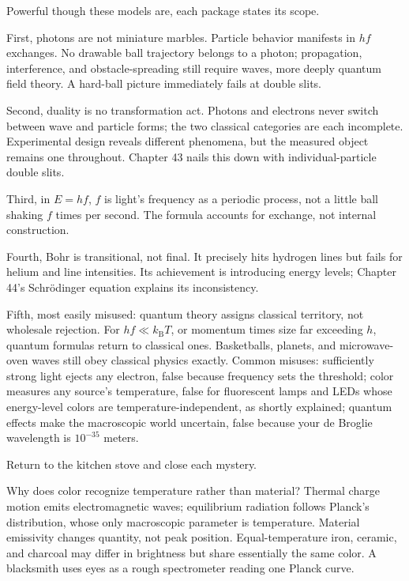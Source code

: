 
Powerful though these models are, each package states its scope.

First, photons are not miniature marbles. Particle behavior manifests in \(hf\) exchanges. No drawable ball trajectory belongs to a photon; propagation, interference, and obstacle-spreading still require waves, more deeply quantum field theory. A hard-ball picture immediately fails at double slits.

Second, duality is no transformation act. Photons and electrons never switch between wave and particle forms; the two classical categories are each incomplete. Experimental design reveals different phenomena, but the measured object remains one throughout. Chapter 43 nails this down with individual-particle double slits.

Third, in \(E = hf\), \(f\) is light's frequency as a periodic process, not a little ball shaking \(f\) times per second. The formula accounts for exchange, not internal construction.

Fourth, Bohr is transitional, not final. It precisely hits hydrogen lines but fails for helium and line intensities. Its achievement is introducing energy levels; Chapter 44's Schrödinger equation explains its inconsistency.

Fifth, most easily misused: quantum theory assigns classical territory, not wholesale rejection. For \(hf \ll k_{\mathrm{B}}T\), or momentum times size far exceeding \(h\), quantum formulas return to classical ones. Basketballs, planets, and microwave-oven waves still obey classical physics exactly. Common misuses: sufficiently strong light ejects any electron, false because frequency sets the threshold; color measures any source's temperature, false for fluorescent lamps and LEDs whose energy-level colors are temperature-independent, as shortly explained; quantum effects make the macroscopic world uncertain, false because your de Broglie wavelength is \(10^{-35}\) meters.


Return to the kitchen stove and close each mystery.

Why does color recognize temperature rather than material? Thermal charge motion emits electromagnetic waves; equilibrium radiation follows Planck's distribution, whose only macroscopic parameter is temperature. Material emissivity changes quantity, not peak position. Equal-temperature iron, ceramic, and charcoal may differ in brightness but share essentially the same color. A blacksmith uses eyes as a rough spectrometer reading one Planck curve.


